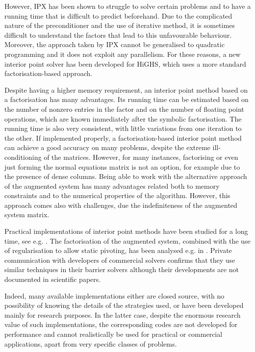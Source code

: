 \documentclass[a4paper]{article}
\newcommand{\0}{\mathbf 0}
\begin{document}
However, IPX has been shown to struggle to solve certain problems and to have a running time that is difficult to predict beforehand. Due to the complicated nature of the preconditioner and the use of iterative method, it is sometimes difficult to understand the factors that lead to this unfavourable behaviour. Moreover, the approach taken by IPX cannot be generalised to quadratic programming and it does not exploit any parallelism. For these reasons, a new interior point solver has been developed for HiGHS, which uses a more standard factorisation-based approach.

Despite having a higher memory requirement, an interior point method based on a factorisation has many advantages. Its running time can be estimated based on the number of nonzero entries in the factor and on the number of floating point operations, which are known immediately after the symbolic factorisation. The running time is also very consistent, with little variations from one iteration to the other. If implemented properly, a factorisation-based interior point method can achieve a good accuracy on many problems, despite the extreme ill-conditioning of the matrices. However, for many instances, factorising or even just forming the normal equations matrix is not an option, for example due to the presence of dense columns. Being able to work with the alternative approach of the augmented system has many advantages related both to memory constraints and to the numerical properties of the algorithm. However, this approach comes also with challenges, due the indefiniteness of the augmented system matrix. 

Practical implementations of interior point methods have been studied for a long time, see e.g. \cite{AndGonMesXu:implementation,GonTer:computational,Meh:predcor}. The factorisation of the augmented system, combined with the use of regularisation to allow static pivoting, has been analysed e.g. in \cite{AltGon:regularization}. Private communication with developers of commercial solvers confirms that they use similar techniques in their barrier solvers although their developments are not documented in scientific papers.

Indeed, many available implementations either are closed source, with no possibility of knowing the details of the strategies used, or have been developed mainly for research purposes. In the latter case, despite the enormous research value of such implementations, the corresponding codes are not developed for performance and cannot realistically be used for practical or commercial applications, apart from very specific classes of problems. 
\end{document}
